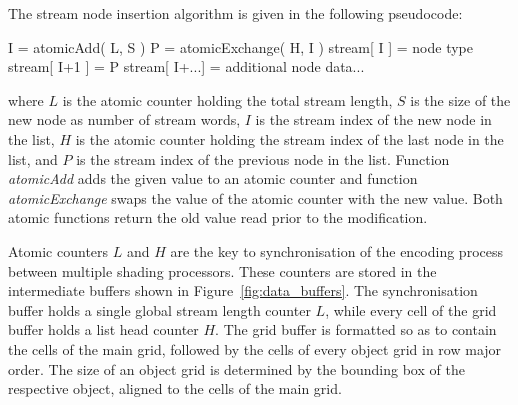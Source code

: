 \documentclass[11pt,a4paper,twoside]{article}
\newenvironment {code}{\footnotesize}{\normalsize}
\begin{document}


The stream node insertion algorithm is given in the following pseudocode:
\begin{verbatimtab}[3]
				I = atomicAdd( L, S )
				P = atomicExchange( H, I )
				stream[ I ] = node type
				stream[ I+1 ] = P
				stream[ I+...] = additional node data...
\end{verbatimtab}
where $L$ is the atomic counter holding the total stream length, $S$ is the size of the new node as number of stream words, $I$ is the stream index of the new node in the list, $H$ is the atomic counter holding the stream index of the last node in the list, and $P$ is the stream index of the previous node in the list. Function \emph{atomicAdd} adds the given value to an atomic counter and function \emph{atomicExchange} swaps the value of the atomic counter with the new value. Both atomic functions return the old value read prior to the modification.


Atomic counters $L$ and $H$ are the key to synchronisation of the encoding process between multiple shading processors. These counters are stored in the intermediate buffers shown in Figure~\ref{fig:data_buffers}. The synchronisation buffer holds a single global stream length counter $L$, while every cell of the grid buffer holds a list head counter $H$. The grid buffer is formatted so as to contain the cells of the main grid, followed by the cells of every object grid in row major order. The size of an object grid is determined by the bounding box of the respective object, aligned to the cells of the main grid.
\end{document}
